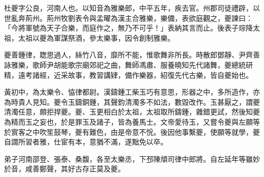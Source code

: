 \begin{pinyinscope}
 
 
 杜夔字公良，河南人也。以知音為雅樂郎，中平五年，疾去官。州郡司徒禮辟，以世亂奔荊州。荊州牧劉表令與孟曜為漢主合雅樂，樂備，表欲庭觀之，夔諫曰：「今將軍號為天子合樂，而庭作之，無乃不可乎！」表納其言而止。後表子琮降太祖，太祖以夔為軍謀祭酒，參太樂事，因令創制雅樂。
 
 
 
 
 夔善鍾律，聦思過人，絲竹八音，靡所不能，惟歌舞非所長。時散郎鄧靜、尹齊善詠雅樂，歌師尹胡能歌宗廟郊祀之曲，舞師馮肅、服養曉知先代諸舞，夔總統研精，遠考諸經，近采故事，教習講肄，備作樂器，紹復先代古樂，皆自夔始也。
 
 
 
 
 黃初中，為太樂令、恊律都尉。漢鑄鍾工柴玉巧有意思，形器之中，多所造作，亦為時貴人見知。夔令玉鑄銅鍾，其聲鈞清濁多不如法，數毀改作。玉甚厭之，謂夔清濁任意，頗拒捍夔。夔、玉更相白於太祖，太祖取所鑄鍾，雜錯更試，然後知夔為精而玉之妄也，於是罪玉及諸子，皆為養馬士。文帝愛待玉，又嘗令夔與左願等於賔客之中吹笙鼓琴，夔有難色，由是帝意不恱。後因他事繫夔，使願等就學，夔自謂所習者雅，仕宦有本，意猶不滿，遂黜免以卒。
 
 
 
 
 弟子河南邵登、張泰、桑馥，各至太樂丞，下邳陳頏司律中郎將。自左延年等雖妙於音，咸善鄭聲，其好古存正莫及夔。
 

\end{pinyinscope}
